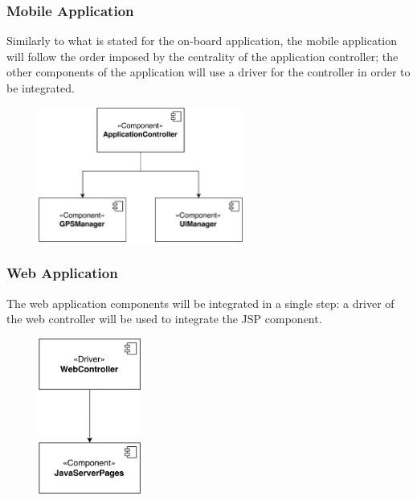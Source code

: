 \subsubsection{Mobile Application}
Similarly to what is stated for the on-board application, the mobile application will follow the order imposed by the centrality of the application controller; the other components of the application will use a driver for the controller in order to be integrated.

\begin{figure}[H]
\begin{center}
		\includegraphics[width=0.6\textwidth]{./integration_strategy/diagrams/mobile.png}
\end{center}
\end{figure}

\subsubsection{Web Application}
The web application components will be integrated in a single step: a driver of the web controller will be used to integrate the JSP component.

\begin{figure}[H]
\begin{center}
		\includegraphics[width=0.3\textwidth]{./integration_strategy/diagrams/web.png}
\end{center}
\end{figure}

